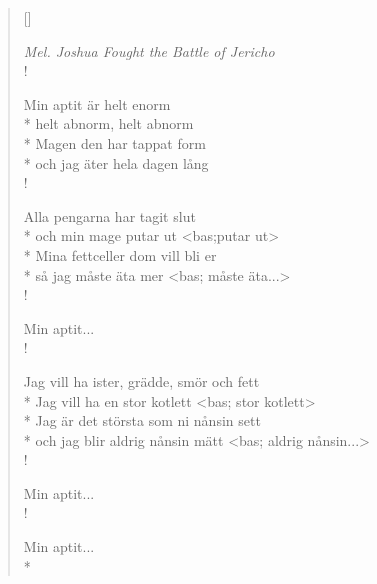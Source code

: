 
\settowidth{\versewidth}{så jag måste äta mer <bas; måste äta...>}


\begin{verse}[\versewidth]

\flagverse{}
\emph{Mel. Joshua Fought the Battle of Jericho}\\!

Min aptit är helt enorm\\*
helt abnorm, helt abnorm\\*
Magen den har tappat form\\*
och jag äter hela dagen lång\\!

Alla pengarna har tagit slut\\*
och min mage putar ut <bas;putar ut>\\*
Mina fettceller dom vill bli er\\*
så jag måste äta mer <bas; måste äta...>\\!

Min aptit...\\!

Jag vill ha ister, grädde, smör och fett\\*
Jag vill ha en stor kotlett <bas; stor kotlett>\\*
Jag är det största som ni nånsin sett\\*
och jag blir aldrig nånsin mätt <bas; aldrig nånsin...>\\!

Min aptit...\\!

Min aptit...\\*

\end{verse}